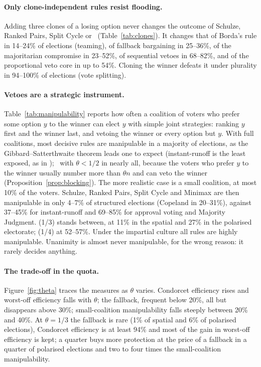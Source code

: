 

\paragraph{Only clone-independent rules resist flooding.} Adding three clones of a losing option never
changes the outcome of Schulze, Ranked Pairs, Split Cycle or \QVC\ (Table~\ref{tab:clones}). It changes
that of Borda's rule in 14--24\% of elections (teaming), of fallback bargaining in 25--36\%, of the
majoritarian compromise in 23--52\%, of sequential vetoes in 68--82\%, and of the proportional veto core
in up to 54\%. Cloning the winner defeats it under plurality in 94--100\% of elections (vote splitting).



\paragraph{Vetoes are a strategic instrument.} Table~\ref{tab:manipulability} reports how often a
coalition of voters who prefer some option $y$ to the winner can elect $y$ with simple joint strategies:
ranking $y$ first and the winner last, and vetoing the winner or every option but $y$. With full coalitions, most decisive rules are manipulable in a majority of elections, as the
Gibbard--Satterthwaite theorem leads one to expect (instant-runoff is the least exposed, as in
\citealp{GreenArmytageTidemanCosman2016}); \QVC\ with $\theta < 1/2$ in nearly all, because the voters who prefer $y$ to the
winner usually number more than $\theta n$ and can veto the winner (Proposition~\ref{prop:blocking}).
The more realistic case is a small coalition, at most 10\% of the voters. Schulze, Ranked Pairs, Split Cycle and Minimax are then manipulable in only 4--7\% of structured
elections (Copeland in 20--31\%), against 37--45\% for instant-runoff and 69--85\% for
approval voting and Majority Judgment. \QVC(1/3) stands between, at 11\% in the spatial and 27\% in the
polarised electorate; \QVC(1/4) at 52--57\%. Under the impartial culture all rules are highly
manipulable. Unanimity is almost never manipulable, for the wrong reason: it rarely decides anything.



\paragraph{The trade-off in the quota.} Figure~\ref{fig:theta} traces the measures as $\theta$ varies.
Condorcet efficiency rises and worst-off efficiency falls with $\theta$; the fallback, frequent below
20\%, all but disappears above 30\%; small-coalition manipulability falls steeply between 20\% and 40\%.
At $\theta = 1/3$ the fallback is rare (1\% of spatial and 6\% of polarised elections), Condorcet
efficiency is at least 94\% and most of the gain in worst-off efficiency is kept; a quarter buys more protection at the price of a fallback in a quarter of polarised elections and two
to four times the small-coalition manipulability.


